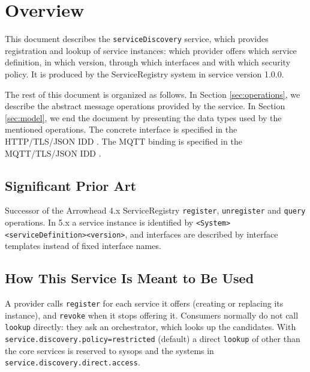 \documentclass[a4paper]{arrowhead}
\begin{document}
\section{Overview}
\label{sec:overview}

This document describes the \texttt{serviceDiscovery} service, which provides registration and lookup of service instances: which provider offers which service definition, in which version, through which interfaces and with which security policy.
It is produced by the ServiceRegistry system \cite{sr-sysd} in service version 1.0.0.

The rest of this document is organized as follows.
In Section \ref{sec:operations}, we describe the abstract message operations provided by the service.
In Section \ref{sec:model}, we end the document by presenting the data types used by the mentioned operations.
The concrete interface is specified in the HTTP/TLS/JSON IDD \cite{sr-serviceDiscovery-http-idd}. The MQTT binding is specified in the MQTT/TLS/JSON IDD \cite{sr-serviceDiscovery-mqtt-idd}.

\subsection{Significant Prior Art}

Successor of the Arrowhead 4.x ServiceRegistry \texttt{register}, \texttt{unregister} and \texttt{query} operations. In 5.x a service instance is identified by \texttt{\textless{}System\textgreater{}\textbar{}\allowbreak{}\textless{}service\allowbreak{}Definition\textgreater{}\textbar{}\allowbreak{}\textless{}version\textgreater{}}, and interfaces are described by interface templates instead of fixed interface names.

\subsection{How This Service Is Meant to Be Used}

A provider calls \texttt{register} for each service it offers (creating or replacing its instance), and \texttt{revoke} when it stops offering it. Consumers normally do not call \texttt{lookup} directly: they ask an orchestrator, which looks up the candidates. With \texttt{service.\allowbreak{}discovery.\allowbreak{}policy=\allowbreak{}restricted} (default) a direct \texttt{lookup} of other than the core services is reserved to sysops and the systems in \texttt{service.\allowbreak{}discovery.\allowbreak{}direct.\allowbreak{}access}.
\end{document}
